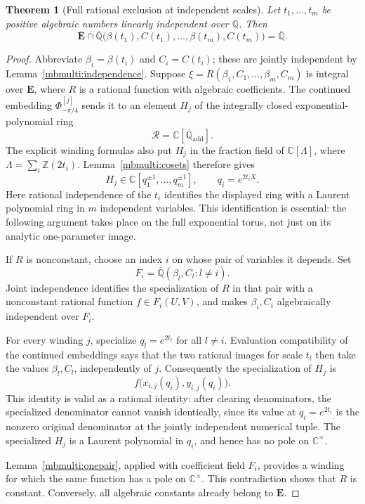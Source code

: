 \documentclass[11pt]{article}
\newtheorem{theorem}{Theorem}[section]
\theoremstyle{definition}
\theoremstyle{remark}
\newcommand{\Qa}{\overline{\mathbb Q}}
\newcommand{\E}{\mathbf E}
\newcommand{\Ebar}{\overline{\mathbf E}}
\begin{document}
\begin{theorem}[Full rational exclusion at independent scales]
\label{mbmulti:main}
Let $t_1,\ldots,t_m$ be positive algebraic numbers linearly independent
over $\mathbb Q$. Then
\[
 \boxed{\quad
 \Ebar\cap\Qa\bigl(\beta(t_1),C(t_1),\ldots,
                          \beta(t_m),C(t_m)\bigr)=\Qa.
 \quad}
\]
\end{theorem}
\begin{proof}
Abbreviate $\beta_i=\beta(t_i)$ and $C_i=C(t_i)$; these are jointly
independent by Lemma~\ref{mbmulti:independence}. Suppose
$\xi=R(\beta_1,C_1,\ldots,\beta_m,C_m)$ is integral over $\E$, where
$R$ is a rational function with algebraic coefficients. The continued
embedding $\Phi_{-\pi/4}^{[j]}$ sends it to an element $H_j$ of the
integrally closed exponential-polynomial ring
\[
 \mathcal R=\mathbb C[\Qa_{\mathrm{add}}].
\]
The explicit winding formulas also put $H_j$ in the fraction field
of $\mathbb C[\Lambda]$, where $\Lambda=\sum_i\mathbb Z(2t_i)$.
Lemma~\ref{mbmulti:cosets} therefore gives
\[
 H_j\in\mathbb C[q_1^{\pm1},\ldots,q_m^{\pm1}],
       \qquad q_i=e^{2t_iX}.
\]
Here rational independence of the $t_i$ identifies the displayed ring
with a Laurent polynomial ring in $m$ independent variables. This
identification is essential: the following argument takes place on
the full exponential torus, not just on its analytic one-parameter
image.

If $R$ is nonconstant, choose an index $i$ on whose pair of variables
it depends. Set
\[
 F_i=\Qa(\beta_l,C_l:l\ne i).
\]
Joint independence identifies the specialization of $R$ in that pair
with a nonconstant rational function $f\in F_i(U,V)$, and makes
$\beta_i,C_i$ algebraically independent over $F_i$.

For every winding $j$, specialize $q_l=e^{2t_l}$ for all $l\ne i$.
Evaluation compatibility of the continued embeddings says that the
two rational images for scale $t_l$ then take the values $\beta_l,C_l$,
independently of $j$. Consequently the specialization of $H_j$ is
\[
 f\bigl(x_{i,j}(q_i),y_{i,j}(q_i)\bigr).
\]
This identity is valid as a rational identity: after clearing
denominators, the specialized denominator cannot vanish identically,
since its value at $q_i=e^{2t_i}$ is the nonzero original denominator
at the jointly independent numerical tuple. The specialized $H_j$
is a Laurent polynomial in $q_i$, and hence has no pole on
$\mathbb C^\times$.

Lemma~\ref{mbmulti:onepair}, applied with coefficient field $F_i$,
provides a winding for which the same function has a pole on
$\mathbb C^\times$. This contradiction shows that $R$ is constant.
Conversely, all algebraic constants already belong to $\E$.
\end{proof}
\end{document}
